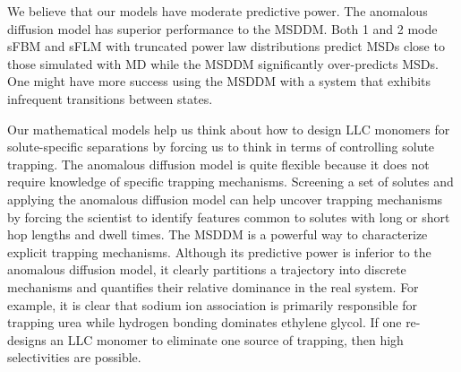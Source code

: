 \documentclass{article}
\begin{document}
  We believe that our models have moderate predictive power. 
  The anomalous
  diffusion model has superior performance to the MSDDM. Both 1 and 2 mode 
  sFBM and sFLM with truncated power law distributions predict MSDs close 
  to those simulated with MD while the MSDDM significantly over-predicts MSDs.
  One might have more success using the MSDDM with a system that exhibits
  infrequent transitions between states.

  Our mathematical models help us think about how to design LLC monomers for 
  solute-specific separations by forcing us to think in terms of controlling 
  solute trapping. The anomalous diffusion model is quite flexible because it
  does not require knowledge of specific trapping mechanisms. Screening a set
  of solutes and applying the anomalous diffusion model can help uncover
  trapping mechanisms by forcing the scientist to identify features common 
  to solutes with long or short hop lengths and dwell times. The MSDDM is a 
  powerful way to characterize explicit trapping mechanisms. Although its
  predictive power is inferior to the anomalous diffusion model, it clearly
  partitions a trajectory into discrete mechanisms and quantifies their
  relative dominance in the real system. For example, it is clear that 
  sodium ion association is primarily responsible for trapping urea while 
  hydrogen bonding dominates ethylene glycol. If one re-designs an LLC monomer
  to eliminate one source of trapping, 
  then high selectivities are possible.
  
%  
%  
%
%  
  
\end{document}
